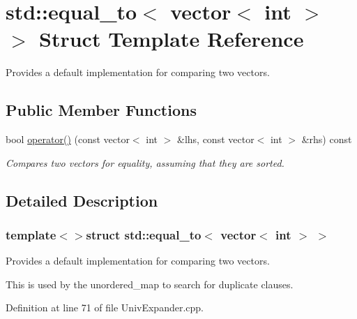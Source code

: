 \hypertarget{structstd_1_1equal__to_3_01vector_3_01int_01_4_01_4}{\section{std\-:\-:equal\-\_\-to$<$ vector$<$ int $>$ $>$ Struct Template Reference}
\label{structstd_1_1equal__to_3_01vector_3_01int_01_4_01_4}
}


Provides a default implementation for comparing two vectors.  


\subsection*{Public Member Functions}
\begin{DoxyCompactItemize}
\item 
bool \hyperlink{structstd_1_1equal__to_3_01vector_3_01int_01_4_01_4_a222ccc2077f5206b75f870331c779625}{operator()} (const vector$<$ int $>$ \&lhs, const vector$<$ int $>$ \&rhs) const 
\begin{DoxyCompactList}\small\item\em Compares two vectors for equality, assuming that they are sorted. \end{DoxyCompactList}\end{DoxyCompactItemize}


\subsection{Detailed Description}
\subsubsection*{template$<$$>$struct std\-::equal\-\_\-to$<$ vector$<$ int $>$ $>$}

Provides a default implementation for comparing two vectors. 

This is used by the unordered\-\_\-map to search for duplicate clauses. 

Definition at line 71 of file Univ\-Expander.\-cpp.



